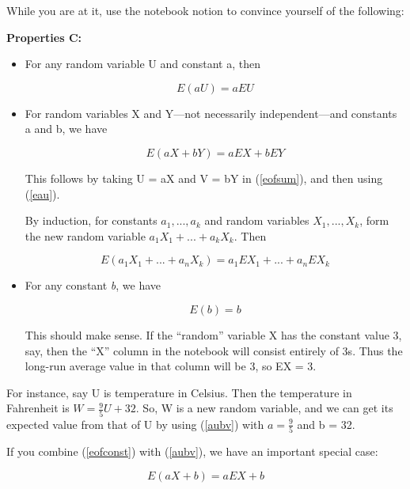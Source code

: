 While you are at it, use the notebook notion to convince yourself of the
following:

{\bf Properties C:}  

\begin{itemize}

\item For any random variable U and constant a, then

\begin{equation}
\label{eau}
E(aU) = a EU
\end{equation}

\item For random variables X and Y---not necessarily independent---and
constants a and b, we have

\begin{equation}
\label{aubv}
E(aX+bY) = a EX + b EY
\end{equation}

This follows by taking U = aX and V = bY in (\ref{eofsum}), and then
using (\ref{eau}).

By induction, for constants $a_1,...,a_k$ and random variables
$X_1,...,X_k$, form the new random variable 
$a_1 X_1 +...+ a_k X_k$.  Then

\begin{equation}
\label{elincomb}
E(a_1 X_1 +...+ a_n X_k) = 
a_1 EX_1 +...+ a_n EX_k
\end{equation}

\item For any constant {\it b}, we have

\begin{equation}
\label{eofconst}
E(b) = b
\end{equation}

This should make sense.  If the ``random'' variable X has the constant
value 3, say, then the ``X'' column in the notebook will consist
entirely of 3s.  Thus the long-run average value in that column will be
3, so EX = 3.

\end{itemize}

For instance, say U is temperature in Celsius.  Then the temperature in
Fahrenheit is $W = \frac{9}{5} U + 32$.  So, W is a new random variable,
and we can get its expected value from that of U by using (\ref{aubv})
with $a = \frac{9}{5}$ and b = 32.

If you combine (\ref{eofconst}) with (\ref{aubv}), we have an important
special case:

\begin{equation}
\label{aub}
E(aX+b) = a EX + b
\end{equation}


